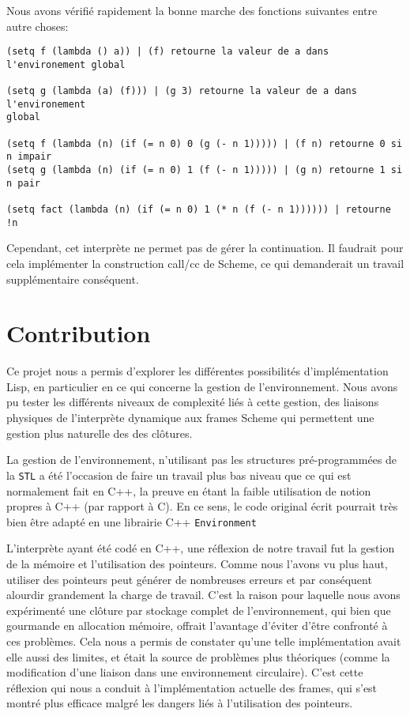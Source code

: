 \documentclass[a4paper,11pt]{article}
\begin{document}
 Nous avons vérifié rapidement la bonne marche des fonctions suivantes entre
 autre choses:

\begin{lstlisting}
(setq f (lambda () a)) | (f) retourne la valeur de a dans l'environement global

(setq g (lambda (a) (f))) | (g 3) retourne la valeur de a dans l'environement
global

(setq f (lambda (n) (if (= n 0) 0 (g (- n 1))))) | (f n) retourne 0 si n impair
(setq g (lambda (n) (if (= n 0) 1 (f (- n 1))))) | (g n) retourne 1 si n pair

(setq fact (lambda (n) (if (= n 0) 1 (* n (f (- n 1)))))) | retourne !n
\end{lstlisting}
 
 Cependant, cet interprète ne permet pas de gérer la continuation. Il faudrait pour 
 cela implémenter la construction call/cc de Scheme, ce qui demanderait un travail supplémentaire 
 conséquent.


\section{Contribution}

Ce projet nous a permis d'explorer les différentes possibilités d'implémentation 
Lisp, en particulier en ce qui concerne la gestion de l'environnement. Nous avons pu 
tester les différents niveaux de complexité liés à cette gestion, des liaisons physiques
de l'interprète dynamique aux frames Scheme qui permettent une gestion plus naturelle des
des clôtures.

La gestion de l'environnement, n'utilisant pas les structures pré-programmées de
la \texttt{STL} a été l'occasion de faire un travail plus bas niveau que ce qui
est normalement fait en C++, la preuve en étant la faible utilisation de
notion propres à C++ (par rapport à C). En ce sens, le code original écrit
pourrait très bien être adapté en une librairie C++ \texttt{Environment}

L'interprète ayant été codé en C++, une réflexion de notre travail fut la gestion de la 
mémoire et l’utilisation des pointeurs. Comme nous l'avons vu plus haut, utiliser 
des pointeurs peut générer de nombreuses erreurs et par conséquent alourdir grandement la charge 
de travail. C'est la raison pour laquelle nous avons expérimenté une clôture par stockage 
complet de l'environnement, qui bien que gourmande en allocation mémoire, offrait l'avantage 
d'éviter d'être confronté à ces problèmes. Cela nous a permis de constater qu'une telle 
implémentation avait elle aussi des limites, et était la source de problèmes plus théoriques 
(comme la modification d'une liaison dans une environnement circulaire). C'est cette réflexion 
qui nous a conduit à l'implémentation actuelle des frames, qui s'est montré plus efficace 
malgré les dangers liés à l'utilisation des pointeurs.
\end{document}
